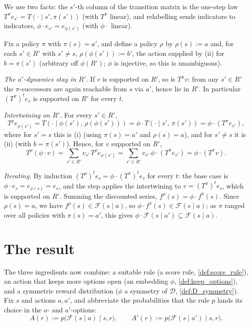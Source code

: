 \documentclass[11pt]{article}
\newcommand{\Dist}{\mathcal{D}}    %
\newcommand{\F}{\mathcal{F}}       %
\begin{document}
\begin{solution}
We use two facts: the $s'$-th column of the transition matrix is the one-step law
$T^\pi e_{s'} = T(\cdot\mid s',\pi(s'))$ (with $T^\pi$ linear), and relabelling sends indicators to
indicators, $\phi\cdot e_{s'} = e_{\phi(s')}$ (with $\phi\cdot$ linear).

Fix a policy $\pi$ with $\pi(s) = a'$, and define a policy $\rho$ by $\rho(s) := a$ and, for
each $s' \in R'$ with $s' \ne s$, $\rho(\phi(s')) := b'$, the action supplied by (ii) for
$b = \pi(s')$ (arbitrary off $\phi(R')$; $\phi$ is injective, so this is unambiguous).

\emph{The $a'$-dynamics stay in $R'$.} If $v$ is supported on $R'$, so is $T^\pi v$: from any
$s' \in R'$ the $\pi$-successors are again reachable from $s$ via $a'$, hence lie in $R'$. In
particular $(T^\pi)^t e_s$ is supported on $R'$ for every $t$.

\emph{Intertwining on $R'$.} For every $s' \in R'$,
\begin{equation*}
T^\rho e_{\phi(s')} = T(\cdot \mid \phi(s'),\, \rho(\phi(s'))) = \phi \cdot T(\cdot\mid s',\, \pi(s')) = \phi\cdot(T^\pi e_{s'}),
\end{equation*}
where for $s' = s$ this is (i) (using $\pi(s)=a'$ and $\rho(s)=a$), and for $s' \ne s$ it is
(ii) (with $b = \pi(s')$). Hence, for $v$ supported on $R'$,
$$
T^\rho(\phi\cdot v) = \sum_{s'\in R'} v_{s'}\, T^\rho e_{\phi(s')} = \sum_{s'\in R'} v_{s'}\, \phi\cdot(T^\pi e_{s'}) = \phi\cdot(T^\pi v).
$$

\emph{Iterating.} By induction $(T^\rho)^t e_s = \phi\cdot(T^\pi)^t e_s$ for
every $t$: the base case is $\phi\cdot e_s = e_{\phi(s)} = e_s$, and the step applies the
intertwining to $v = (T^\pi)^t e_s$, which is supported on $R'$. Summing the discounted series,
$f^\rho(s) = \phi\cdot f^\pi(s)$. Since $\rho(s) = a$, we have $f^\rho(s) \in \F(s\mid a)$, so
$\phi\cdot f^\pi(s) \in \F(s\mid a)$; as $\pi$ ranged over all policies with $\pi(s)=a'$, this
gives $\phi\cdot\F(s\mid a') \subseteq \F(s\mid a)$.
\end{solution}

\section*{The result}

The three ingredients now combine: a suitable rule (a score rule, \cref{def:score_rule}), an action
that keeps more options open (an embedding $\phi$, \cref{def:keep_options}), and a symmetric reward
distribution ($\phi$ a symmetry of $\Dist$, \cref{def:D_symmetry}). Fix $s$ and actions $a,a'$, and
abbreviate the probabilities that the rule $p$ lands its choice in the $a$- and $a'$-options:
$$
A(r) := p\bigl(\F(s\mid a)\mid s,r\bigr), \qquad A'(r) := p\bigl(\F(s\mid a')\mid s,r\bigr).
$$
\end{document}
